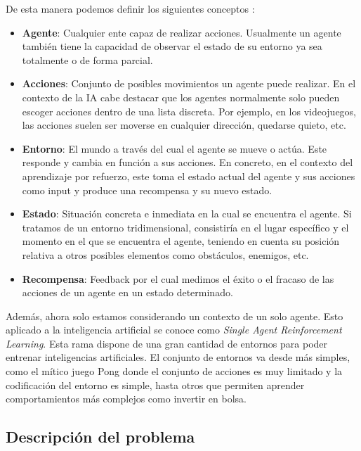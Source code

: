 De esta manera podemos definir los siguientes conceptos \cite {wiki_path}:
\begin{itemize}
	\item \textbf{Agente}: Cualquier ente capaz de realizar acciones. Usualmente un agente también tiene la capacidad de observar el estado de su entorno ya sea totalmente o de forma parcial.
	\item \textbf{Acciones}: Conjunto de posibles movimientos un agente puede realizar. En el contexto de la IA cabe destacar que los agentes normalmente solo pueden escoger acciones dentro de una lista discreta. Por ejemplo, en los videojuegos, las acciones suelen ser moverse en cualquier dirección, quedarse quieto, etc.
	\item \textbf{Entorno}: El mundo a través del cual el agente se mueve o actúa. Este responde y cambia en función a sus acciones. En concreto, en el contexto del aprendizaje por refuerzo, este toma el estado actual del agente y sus acciones como input y produce una recompensa y su nuevo estado.
	\item \textbf{Estado}: Situación concreta e inmediata en la cual se encuentra el agente. Si tratamos de un entorno tridimensional, consistiría en el lugar específico y el momento en el que se encuentra el agente, teniendo en cuenta su posición relativa a otros posibles elementos como obstáculos, enemigos, etc.
	\item \textbf{Recompensa}: Feedback por el cual medimos el éxito o el fracaso de las acciones de un agente en un estado determinado.  
\end{itemize}

Además, ahora solo estamos considerando un contexto de un solo agente. Esto aplicado a la inteligencia artificial se conoce como \emph{Single Agent Reinforcement Learning}. Esta rama dispone de una gran cantidad de entornos para poder entrenar inteligencias artificiales. El conjunto de entornos va desde más simples, como el mítico juego Pong donde el conjunto de acciones es muy limitado y la codificación del entorno es simple, hasta otros que permiten aprender comportamientos más complejos como invertir en bolsa.

\subsection{Descripción del problema}

